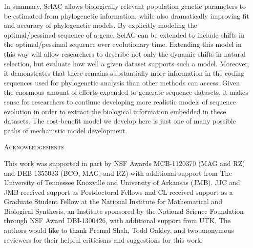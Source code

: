 \documentclass[12pt,letterpaper,fleqn]{article}
\renewcommand{\section}[1]{%
\bigskip
\begin{center}
\begin{Large}
\normalfont\scshape #1
\medskip
\end{Large}
\end{center}}
\newcommand{\PC}{physicochemical\xspace}
\newcommand{\selac}{SelAC\xspace}
\begin{document}

In summary, \selac allows biologically relevant population genetic parameters to be estimated from phylogenetic information, while also dramatically improving fit and accuracy of phylogenetic models.
By explicitly modeling the optimal/pessimal sequence of a gene, \selac can be extended to include shifts in the optimal/pessimal sequence over evolutionary time.
Extending this model in this way will allow researchers to describe not only the dynamic shifts in natural selection, but evaluate how well a given dataset supports such a model.
Moreover, it demonstrates that there remains substantially more information in the coding sequences used for phylogenetic analysis than other methods can access.
Given the enormous amount of efforts expended to generate sequence datasets, it makes sense for researchers to continue developing more realistic models of sequence evolution in order to extract the biological information embedded in these datasets.
The cost-benefit model we develop here is just one of many possible paths of mechanistic model development.






\section{Acknowledgements}
This work was supported in part by NSF Awards MCB-1120370 (MAG and RZ) and DEB-1355033 (BCO, MAG, and RZ) with additional support from The University of Tennessee Knoxville and University of Arkansas (JMB).
JJC and JMB received support as Postdoctoral Fellows and CL received support as a Graduate Student Fellow at the National Institute for Mathematical and Biological Synthesis, an Institute sponsored by the National Science Foundation through NSF Award DBI-1300426, with additional support from UTK.
The authors would like to thank Premal Shah, Todd Oakley, and two anonymous reviewers for their helpful criticisms and suggestions for this work.
\clearpage
\end{document}
